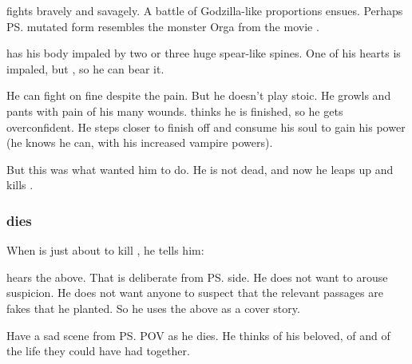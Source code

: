 \Teshrial{} fights bravely and savagely. 
A battle of Godzilla-like proportions ensues. 
Perhaps \ps{\Teshrial} mutated form resembles the monster Orga from the movie \cite{Movie:Godzilla2000}. 

\Ishnaruchaefir{} has his body impaled by two or three huge spear-like spines. 
One of his hearts is impaled, but , so he can bear it. 

He can fight on fine despite the pain. 
But he doesn't play stoic. 
He growls and pants with pain of his many wounds. 
\Teshrial{} thinks he is finished, so he gets overconfident. 
He steps closer to finish off \Ishnaruchaefir{} and consume his soul to gain his power (he knows he can, with his increased vampire powers). 


But this was what \Ishnaruchaefir{} wanted him to do. 
He is not dead, and now he leaps up and kills \Teshrial. 





\subsubsection{\Teshrial dies}
When \Ishnaruchaefir is just about to kill \Teshrial, he tells him:

\begin{prose}
\end{prose}

\Menessiaraid hears the above. 
That is deliberate from \ps{\Ishnaruchaefir} side.
He does not want to arouse suspicion. 
He does not want anyone to suspect that the relevant \WanderersInDarknessEmph passages are fakes that he planted. 
So he uses the above as a cover story. 

Have a sad scene from \ps{\Teshrial} POV as he dies. 
He thinks of his beloved, of  and of the life they could have had together. 





